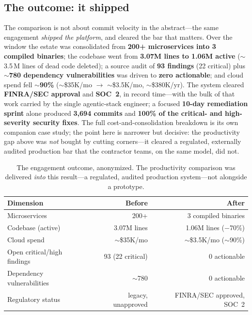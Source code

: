 \documentclass[11pt,letterpaper]{article}
\begin{document}
\subsection{The outcome: it shipped}
The comparison is not about commit velocity in the abstract---the same engagement
\emph{shipped the platform}, and cleared the bar that matters. Over the window the
estate was consolidated from \textbf{200+ microservices into 3 compiled binaries};
the codebase went from \textbf{3.07M lines to 1.06M active} ($\sim$3.5\,M lines of
dead code deleted); a source audit of \textbf{93 findings} (22 critical) plus
\textbf{$\sim$780 dependency vulnerabilities} was driven to \textbf{zero actionable};
and cloud spend fell \textbf{$\sim$90\%} ($\sim$\$35K/mo $\rightarrow$
$\sim$\$3.5K/mo, $\sim$\$380K/yr). The system cleared \textbf{FINRA/SEC approval} and
\textbf{SOC~2}, in record time---with the bulk of that work carried by the single
agentic-stack engineer; a focused \textbf{10-day remediation sprint} alone produced
\textbf{3{,}694 commits} and \textbf{100\% of the critical- and high-severity
security fixes}. The full cost-and-consolidation breakdown is its own companion case
study; the point here is narrower but decisive: the productivity gap above was
\emph{not} bought by cutting corners---it cleared a regulated, externally audited
production bar that the contractor teams, on the same model, did not.

\begin{table}[H]
\centering
\small
\begin{tabular}{l r r}
\toprule
\textbf{Dimension} & \textbf{Before} & \textbf{After} \\
\midrule
Microservices            & 200+                & 3 compiled binaries \\
Codebase (active)        & 3.07M lines         & 1.06M lines ($-$70\%) \\
Cloud spend              & $\sim$\$35K/mo      & $\sim$\$3.5K/mo ($\sim$90\%) \\
Open critical/high findings & 93 (22 critical) & 0 actionable \\
Dependency vulnerabilities  & $\sim$780         & 0 actionable \\
Regulatory status        & legacy, unapproved  & FINRA/SEC approved, SOC~2 \\
\bottomrule
\end{tabular}
\caption{The engagement outcome, anonymized. The productivity comparison was
delivered \emph{into} this result---a regulated, audited production system---not
alongside a prototype.}
\end{table}
\end{document}
